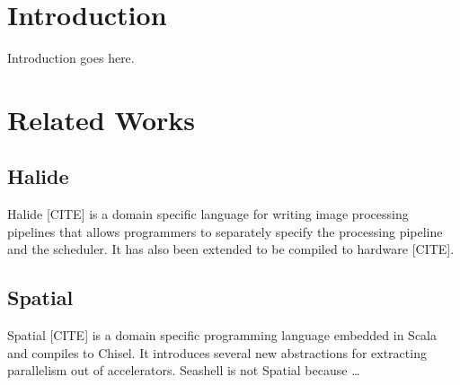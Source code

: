 \documentclass[acmsmall,review,anonymous]{acmart}\settopmatter{printfolios=true,printccs=false,printacmref=false}
\begin{document}


\maketitle

\section{Introduction}
Introduction goes here.


\section{Related Works}

\subsection{Halide}
Halide [CITE] is a domain specific language for writing image processing
pipelines that allows programmers to separately specify the processing pipeline
and the scheduler. It has also been extended to be compiled to hardware [CITE].


\subsection{Spatial}
Spatial [CITE] is a domain specific programming language embedded in Scala
and compiles to Chisel. It introduces several new abstractions for extracting
parallelism out of accelerators. Seashell is not Spatial because \ldots
\end{document}
